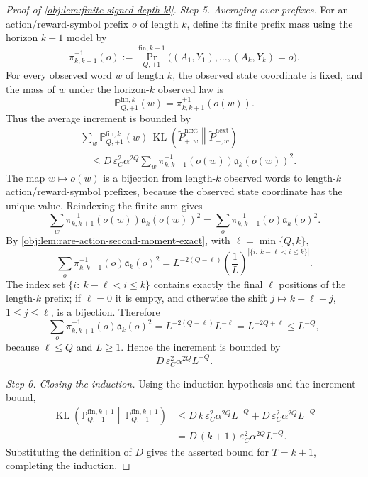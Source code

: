 \begin{proof}[Proof of \cref{obj:lem:finite-signed-depth-kl}]
\emph{Step 5. Averaging over prefixes.}
For an action/reward-symbol prefix \(o\) of length \(k\), define its finite prefix mass using the horizon \(k+1\) model by
\[
\pi_{k,k+1}^{+1}(o)
:=
\Pr_{Q,+1}^{\mathrm{fin},k+1}\!
\bigl((A_1,Y_1),\ldots,(A_k,Y_k)=o\bigr).
\]
For every observed word \(w\) of length \(k\), the observed state coordinate is fixed, and the mass of \(w\) under the horizon-\(k\) observed law is
\[
\mathbb P_{Q,+1}^{\mathrm{fin},k}(w)
=
\pi_{k,k+1}^{+1}(o(w)).
\]
Thus the average increment is bounded by
\[
\begin{aligned}
&\sum_{w}
\mathbb P_{Q,+1}^{\mathrm{fin},k}(w)\,
\operatorname{KL}\!\left(\widetilde P_{+,w}^{\mathrm{next}}\middle\|\widetilde P_{-,w}^{\mathrm{next}}\right)\\
&\quad\le
D\,\varepsilon_C^2\alpha^{2Q}
\sum_{w}
\pi_{k,k+1}^{+1}(o(w))\mathfrak a_k(o(w))^2 .
\end{aligned}
\]
The map \(w\mapsto o(w)\) is a bijection from length-\(k\) observed words to length-\(k\) action/reward-symbol prefixes, because the observed state coordinate has the unique value.  Reindexing the finite sum gives
\[
\sum_{w}
\pi_{k,k+1}^{+1}(o(w))\mathfrak a_k(o(w))^2
=
\sum_o \pi_{k,k+1}^{+1}(o)\mathfrak a_k(o)^2 .
\]
By \cref{obj:lem:rare-action-second-moment-exact}, with \(\ell=\min\{Q,k\}\),
\[
\sum_o \pi_{k,k+1}^{+1}(o)\mathfrak a_k(o)^2
=
L^{-2(Q-\ell)}
\left(\frac{1}{L}\right)^{|\{i:\ k-\ell<i\le k\}|}.
\]
The index set \(\{i:\ k-\ell<i\le k\}\) contains exactly the final \(\ell\) positions of the length-\(k\) prefix; if \(\ell=0\) it is empty, and otherwise the shift \(j\mapsto k-\ell+j\), \(1\le j\le\ell\), is a bijection.  Therefore
\[
\sum_o \pi_{k,k+1}^{+1}(o)\mathfrak a_k(o)^2
=
L^{-2(Q-\ell)}L^{-\ell}
=
L^{-2Q+\ell}
\le L^{-Q},
\]
because \(\ell\le Q\) and \(L\ge 1\).  Hence the increment is bounded by
\[
D\,\varepsilon_C^2\alpha^{2Q}L^{-Q}.
\] %

\emph{Step 6. Closing the induction.}
Using the induction hypothesis and the increment bound,
\[
\begin{aligned}
\operatorname{KL}\!\left(\mathbb P_{Q,+1}^{\mathrm{fin},k+1}
 \middle\|\mathbb P_{Q,-1}^{\mathrm{fin},k+1}\right)
&\le
D\,k\,\varepsilon_C^2\alpha^{2Q}L^{-Q}
+
D\,\varepsilon_C^2\alpha^{2Q}L^{-Q} \\
&=
D\,(k+1)\,\varepsilon_C^2\alpha^{2Q}L^{-Q}.
\end{aligned}
\]
Substituting the definition of \(D\) gives the asserted bound for \(T=k+1\), completing the induction. %
\end{proof}
